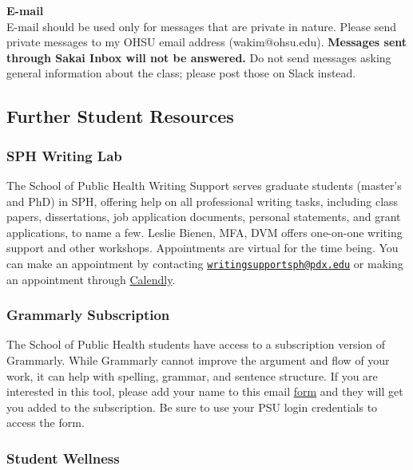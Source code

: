 \documentclass[
  letterpaper,
  DIV=11,
  numbers=noendperiod]{scrartcl}
\begin{document}
\textbf{E-mail}\\
E-mail should be used only for messages that are private in nature.
Please send private messages to my OHSU email address (wakim@ohsu.edu).
\textbf{Messages sent through Sakai Inbox will not be answered.} Do not
send messages asking general information about the class; please post
those on Slack instead.

\subsection{Further Student Resources}\label{further-student-resources}

\subsubsection{SPH Writing Lab}\label{sph-writing-lab}

The School of Public Health Writing Support serves graduate students
(master's and PhD) in SPH, offering help on all professional writing
tasks, including class papers, dissertations, job application documents,
personal statements, and grant applications, to name a few. Leslie
Bienen, MFA, DVM offers one-on-one writing support and other workshops.
Appointments are virtual for the time being. You can make an appointment
by contacting
\href{mailto:writingsupportsph@pdx.edu}{\nolinkurl{writingsupportsph@pdx.edu}}
or making an appointment through
\href{https://calendly.com/writingsupportsph/writing-meeting}{Calendly}.

\subsubsection{Grammarly Subscription}\label{grammarly-subscription}

The School of Public Health students have access to a subscription
version of Grammarly. While Grammarly cannot improve the argument and
flow of your work, it can help with spelling, grammar, and sentence
structure. If you are interested in this tool, please add your name to
this email
\href{https://docs.google.com/forms/d/1IQWFsARrTJlasK2a5JTonR4ygr8MxqIzbh_bAxKmWWI/edit?ts=614ce07a}{form}
and they will get you added to the subscription. Be sure to use your PSU
login credentials to access the form.

\subsubsection{Student Wellness}\label{student-wellness}
\end{document}
